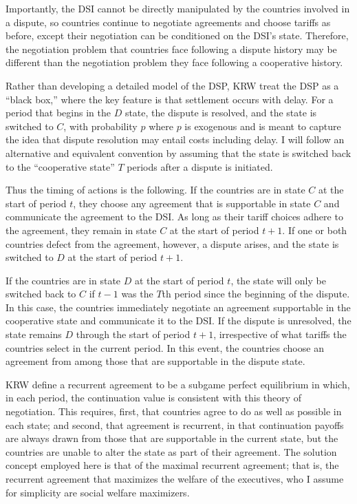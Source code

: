 \documentclass[authoryear, review]{elsarticle}
\begin{document}
Importantly, the DSI cannot be directly manipulated by the countries involved in a dispute, so countries continue to negotiate agreements and choose tariffs as before, except their negotiation can be conditioned on the DSI's state. Therefore, the negotiation problem that countries face following a
dispute history may be different than the negotiation problem they face following a cooperative history.

Rather than developing a detailed model of the DSP, KRW treat the DSP as a ``black box,'' where the key feature is that settlement occurs with delay. For a period that begins in the $D$ state, the dispute is resolved, and the state is switched to $C$, with probability $p$ where $p$ is exogenous and is meant to capture the idea that dispute resolution may entail costs including delay. I will follow an alternative and equivalent convention by assuming that the state is switched back to the ``cooperative state'' $T$ periods after a dispute is initiated.

Thus the timing of actions is the following. If the countries are in state $C$ at the start of period $t$, they choose any agreement that is supportable in state $C$ and communicate the agreement to the DSI. As long as their tariff choices adhere to the agreement, they remain in state $C$ at the start of period $t+1$. If one or both countries defect from the agreement, however, a dispute arises, and the state is switched to $D$ at the start of period $t+1$.

If the countries are in state $D$ at the start of period $t$, the state will only be switched back to $C$ if $t-1$ was the $T$th period since the beginning of the dispute. In this case, the countries immediately negotiate an agreement supportable in the cooperative state and communicate it to the DSI. If the dispute is unresolved, the state remains $D$ through the start of period $t+1$, irrespective of what tariffs the countries select in the current period. In this event, the countries choose an agreement from among those that are supportable in the dispute state.

KRW define a recurrent agreement to be a subgame perfect equilibrium in which, in each period, the continuation value is consistent with this theory of negotiation. This requires, first, that countries agree to do as well as possible in each state; and second, that agreement is recurrent, in that continuation payoffs are always drawn from those that are supportable in the current state, but the countries are unable to alter the state as part of their agreement. The solution concept employed here is that of the maximal recurrent agreement; that is, the recurrent agreement that maximizes the welfare of the executives, who I assume for simplicity are social welfare maximizers.
\end{document}
